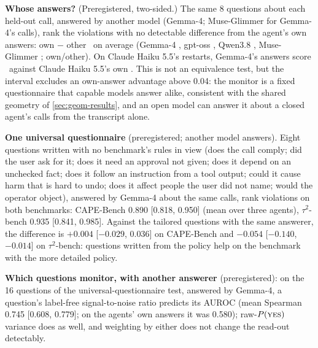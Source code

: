 \textbf{Whose answers?} (Preregistered, two-sided.) The same 8 questions about each held-out call, answered by another model (Gemma-4; Muse-Glimmer for Gemma-4's calls), rank the violations with no detectable difference from the agent's own answers: own $-$ other \GSixteenOone\ on average (Gemma-4 \GSixteenGemma, gpt-oss \GSixteenGpt, Qwen3.8 \GSixteenQwen, Muse-Glimmer \GSixteenMuse; own/other). On Claude Haiku 5.5's restarts, Gemma-4's answers score \GSixteenClosedAOther\ against Claude Haiku 5.5's own \GSixteenClosedAOwn. This is not an equivalence test, but the interval excludes an own-answer advantage above 0.04: the monitor is a fixed questionnaire that capable models answer alike, consistent with the shared geometry of \cref{sec:geom-results}, and an open model can answer it about a closed agent's calls from the transcript alone.

\textbf{One universal questionnaire} (preregistered; another model answers). Eight questions written with no benchmark's rules in view (does the call comply; did the user ask for it; does it need an approval not given; does it depend on an unchecked fact; does it follow an instruction from a tool output; could it cause harm that is hard to undo; does it affect people the user did not name; would the operator object), answered by Gemma-4 about the same calls, rank violations on both benchmarks: CAPE-Bench 0.890 [0.818, 0.950] (mean over three agents), $\tau^2$-bench 0.935 [0.841, 0.985]. Against the tailored questions with the same answerer, the difference is $+0.004$ [$-0.029$, 0.036] on CAPE-Bench and $-0.054$ [$-0.140$, $-0.014$] on $\tau^2$-bench: questions written from the policy help on the benchmark with the more detailed policy.

\textbf{Which questions monitor, with another answerer} (preregistered): on the 16 questions of the universal-questionnaire test, answered by Gemma-4, a question's label-free signal-to-noise ratio predicts its AUROC (mean Spearman 0.745 [0.608, 0.779]; on the agents' own answers it was 0.580); raw-$P(\textsc{yes})$ variance does as well, and weighting by either does not change the read-out detectably.

